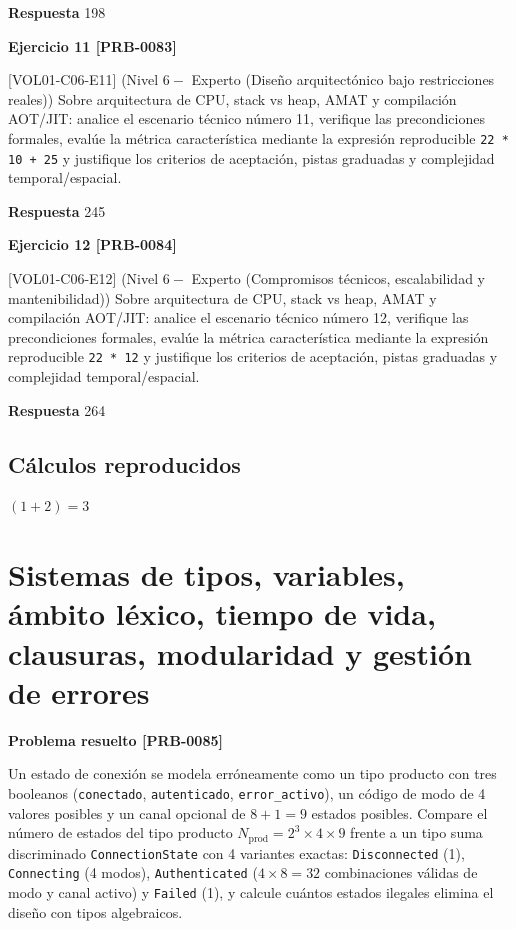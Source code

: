 \documentclass{book}
\begin{document}
\noindent\textbf{Respuesta} 198

\noindent\textbf{Ejercicio 11 [PRB-0083]}

[VOL01-C06-E11] (Nivel \(6 -\) Experto (Diseño arquitectónico bajo restricciones reales)) Sobre arquitectura de CPU, stack vs heap, AMAT y compilación AOT/JIT: analice el escenario técnico número 11, verifique las precondiciones formales, evalúe la métrica característica mediante la expresión reproducible \texttt{22 * 10 + 25} y justifique los criterios de aceptación, pistas graduadas y complejidad temporal/espacial.

\noindent\textbf{Respuesta} 245

\noindent\textbf{Ejercicio 12 [PRB-0084]}

[VOL01-C06-E12] (Nivel \(6 -\) Experto (Compromisos técnicos, escalabilidad y mantenibilidad)) Sobre arquitectura de CPU, stack vs heap, AMAT y compilación AOT/JIT: analice el escenario técnico número 12, verifique las precondiciones formales, evalúe la métrica característica mediante la expresión reproducible \texttt{22 * 12} y justifique los criterios de aceptación, pistas graduadas y complejidad temporal/espacial.

\noindent\textbf{Respuesta} 264

\subsection*{Cálculos reproducidos}

\(\left(1+2\right) = 3\)

\section{Sistemas de tipos, variables, ámbito léxico, tiempo de vida, clausuras, modularidad y gestión de errores}

\noindent\textbf{Problema resuelto [PRB-0085]}

Un estado de conexión se modela erróneamente como un tipo producto con tres booleanos (\texttt{conectado}, \texttt{autenticado}, \texttt{error\_activo}), un código de modo de 4 valores posibles y un canal opcional de \(8 + 1 = 9\) estados posibles. Compare el número de estados del tipo producto \(N_{\text{prod}} = 2^3 \times 4 \times 9\) frente a un tipo suma discriminado \texttt{ConnectionState} con 4 variantes exactas: \texttt{Disconnected} (1), \texttt{Connecting} (4 modos), \texttt{Authenticated} (\(4 \times 8 = 32\) combinaciones válidas de modo y canal activo) y \texttt{Failed} (1), y calcule cuántos estados ilegales elimina el diseño con tipos algebraicos.
\end{document}

